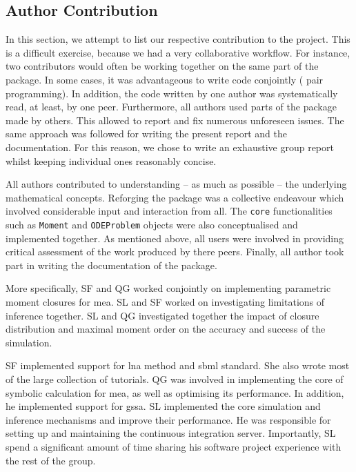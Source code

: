 \subsection{Author Contribution}
In this section, we attempt to list our respective contribution to the project.
This is a difficult exercise, because we had a very collaborative workflow.
For instance,  two contributors would often be working together on the same part of the package.
In some cases, it was advantageous to write code conjointly (\ie{} pair programming).
In addition, the code written by one author was systematically read, at least, by one peer.
Furthermore,  all authors used  parts of the package made by others.
This allowed to report and fix numerous unforeseen issues.
The same approach was followed for writing the present report and the documentation.
For this reason, we chose to write an exhaustive group report whilst keeping individual ones reasonably concise.


All authors contributed to understanding -- as much as possible -- the underlying mathematical concepts.
Reforging the package was a collective endeavour which involved considerable input and interaction from all.
The \texttt{core} functionalities such as \texttt{Moment} and \texttt{ODEProblem} objects were also conceptualised and implemented together.  
As mentioned above, all users were involved in providing critical assessment of the work produced by there peers.
Finally, all author took part in writing the documentation of the package.

More specifically, SF and QG worked conjointly on implementing parametric moment closures for \gls{mea}.
SL and SF worked on  investigating limitations of inference together.
SL and QG investigated together the impact of closure distribution and maximal moment order on the accuracy and success of the simulation.


SF implemented support for \gls{lna} method and \gls{sbml} standard.
She also wrote most of the large collection of tutorials.
QG was involved in implementing the core of symbolic calculation for \gls{mea}, as well as optimising its performance.
In addition, he implemented support for \gls{gssa}.
SL implemented the core simulation and inference mechanisms and improve their performance.
He was responsible for setting up and maintaining the continuous integration server.
Importantly, SL spend a significant amount of time sharing his software project experience with the rest of the group.


